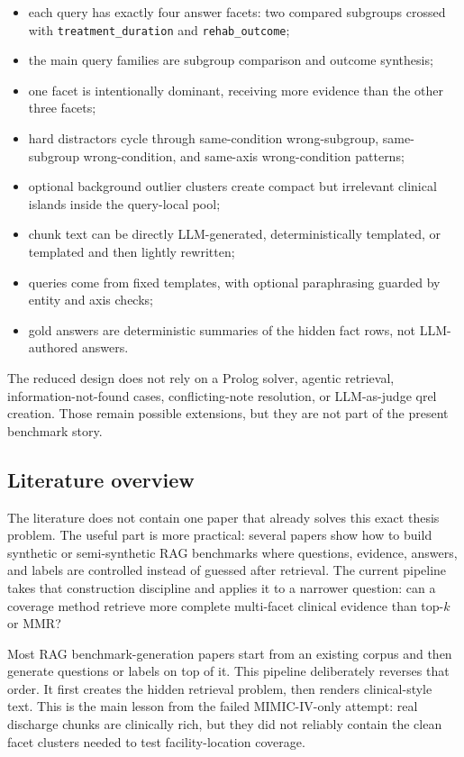 \documentclass[11pt,a4paper]{article}
\newcommand{\field}[1]{\texttt{#1}}
\begin{document}
\begin{itemize}[noitemsep, topsep=0pt]
	\item each query has exactly four answer facets: two compared subgroups crossed with \field{treatment\_duration} and \field{rehab\_outcome};
	\item the main query families are subgroup comparison and outcome synthesis;
	\item one facet is intentionally dominant, receiving more evidence than the other three facets;
	\item hard distractors cycle through same-condition wrong-subgroup, same-subgroup wrong-condition, and same-axis wrong-condition patterns;
	\item optional background outlier clusters create compact but irrelevant clinical islands inside the query-local pool;
	\item chunk text can be directly LLM-generated, deterministically templated, or templated and then lightly rewritten;
	\item queries come from fixed templates, with optional paraphrasing guarded by entity and axis checks;
	\item gold answers are deterministic summaries of the hidden fact rows, not LLM-authored answers.
\end{itemize}

The reduced design does not rely on a Prolog solver, agentic retrieval, information-not-found cases, conflicting-note resolution, or LLM-as-judge qrel creation. Those remain possible extensions, but they are not part of the present benchmark story.

\subsection{Literature overview}

The literature does not contain one paper that already solves this exact thesis problem. The useful part is more practical: several papers show how to build synthetic or semi-synthetic RAG benchmarks where questions, evidence, answers, and labels are controlled instead of guessed after retrieval. The current pipeline takes that construction discipline and applies it to a narrower question: can a coverage method retrieve more complete multi-facet clinical evidence than top-$k$ or MMR?

Most RAG benchmark-generation papers start from an existing corpus and then generate questions or labels on top of it. This pipeline deliberately reverses that order. It first creates the hidden retrieval problem, then renders clinical-style text. This is the main lesson from the failed MIMIC-IV-only attempt: real discharge chunks are clinically rich, but they did not reliably contain the clean facet clusters needed to test facility-location coverage.
\end{document}
